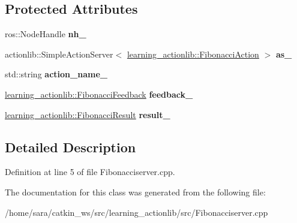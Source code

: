 \subsection*{Protected Attributes}
\begin{DoxyCompactItemize}
\item 
\mbox{\label{classFibonacciAction_ae5414664ec28f5f7a30ca0fbd5e549fd}} 
ros\+::\+Node\+Handle {\bfseries nh\+\_\+}
\item 
\mbox{\label{classFibonacciAction_a1a56c6e35dbc90a074c6ea776cd4e156}} 
actionlib\+::\+Simple\+Action\+Server$<$ \hyperlink{structlearning__actionlib_1_1FibonacciAction__}{learning\+\_\+actionlib\+::\+Fibonacci\+Action} $>$ {\bfseries as\+\_\+}
\item 
\mbox{\label{classFibonacciAction_a731200d9b889f6f08492516c82540ea9}} 
std\+::string {\bfseries action\+\_\+name\+\_\+}
\item 
\mbox{\label{classFibonacciAction_ab688819d38923de216245ce1fa8bf904}} 
\hyperlink{structlearning__actionlib_1_1FibonacciFeedback__}{learning\+\_\+actionlib\+::\+Fibonacci\+Feedback} {\bfseries feedback\+\_\+}
\item 
\mbox{\label{classFibonacciAction_af1dbb9c7243859c1378b1af6a5a98282}} 
\hyperlink{structlearning__actionlib_1_1FibonacciResult__}{learning\+\_\+actionlib\+::\+Fibonacci\+Result} {\bfseries result\+\_\+}
\end{DoxyCompactItemize}


\subsection{Detailed Description}


Definition at line 5 of file Fibonacciserver.\+cpp.



The documentation for this class was generated from the following file\+:\begin{DoxyCompactItemize}
\item 
/home/sara/catkin\+\_\+ws/src/learning\+\_\+actionlib/src/Fibonacciserver.\+cpp\end{DoxyCompactItemize}

